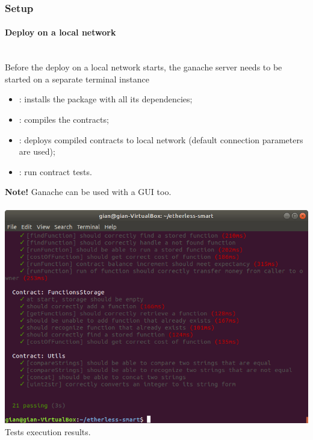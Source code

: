 \subsubsection{Setup}
\paragraph{Deploy on a local network}
\\Before the deploy on a local network starts, the ganache server needs to be started on a separate terminal instance 
\begin{itemize}
    \item {} : installs the package with all its dependencies;    
    \item {}: compiles the contracts;
    \item {}: deploys compiled contracts to local network (default connection parameters are used);
    \item {}: run contract tests.
\end{itemize}
\textbf{Note!} Ganache can be used with a GUI too.\\\\
\includegraphics[width=\textwidth]{res/img/truffleTest.png}
Tests execution results.
